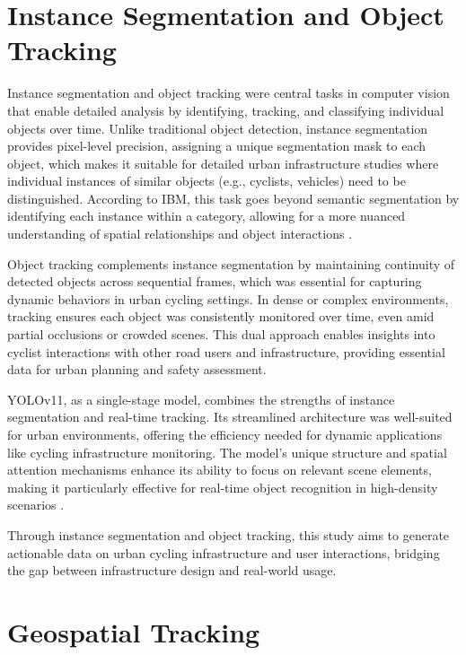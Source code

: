 \section{Instance Segmentation and Object Tracking}

Instance segmentation and object tracking were central tasks in computer vision that enable detailed analysis by identifying, tracking, and classifying individual objects over time. Unlike traditional object detection, instance segmentation provides pixel-level precision, assigning a unique segmentation mask to each object, which makes it suitable for detailed urban infrastructure studies where individual instances of similar objects (e.g., cyclists, vehicles) need to be distinguished. According to IBM, this task goes beyond semantic segmentation by identifying each instance within a category, allowing for a more nuanced understanding of spatial relationships and object interactions \citep{IBM:InstanceSegmentation}. 

Object tracking complements instance segmentation by maintaining continuity of detected objects across sequential frames, which was essential for capturing dynamic behaviors in urban cycling settings. In dense or complex environments, tracking ensures each object was consistently monitored over time, even amid partial occlusions or crowded scenes. This dual approach enables insights into cyclist interactions with other road users and infrastructure, providing essential data for urban planning and safety assessment.

YOLOv11, as a single-stage model, combines the strengths of instance segmentation and real-time tracking. Its streamlined architecture was well-suited for urban environments, offering the efficiency needed for dynamic applications like cycling infrastructure monitoring. The model's unique structure and spatial attention mechanisms enhance its ability to focus on relevant scene elements, making it particularly effective for real-time object recognition in high-density scenarios \citep{Villegas2024:TrackingInUrbanSpaces, khanam2024yolov11overview}.

Through instance segmentation and object tracking, this study aims to generate actionable data on urban cycling infrastructure and user interactions, bridging the gap between infrastructure design and real-world usage.
 
\section{Geospatial Tracking}

